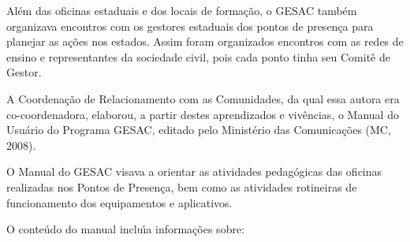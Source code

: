 \documentclass[
12pt,		%
openright,	%
twoside,  %
a4paper,			%
chapter=TITLE,		%
english,			%
french,				%
spanish,			%
brazil				%
]{USPSC-classe/USPSC}
\begin{document}
\noindent\begin{center}\mbox{\centering{}}\end{center}


Al\'em das oficinas estaduais e dos locais de forma\c{c}\~ao, o GESAC tamb\'em organizava encontros com os gestores estaduais dos pontos de presen\c{c}a para planejar as a\c{c}\~oes nos estados. Assim foram organizados encontros com as redes de ensino e  representantes da sociedade civil, pois cada ponto  tinha seu Comit\^e de Gestor.










A Coordena\c{c}\~ao de Relacionamento com as Comunidades, da qual essa autora era co-coordenadora, elaborou, a partir destes aprendizados e viv\^encias, o \textquotedbl Manual do Usu\'ario do Programa GESAC\textquotedbl , editado pelo Minist\'erio das Comunica\c{c}\~oes (MC, 2008).










O Manual do GESAC visava a orientar as atividades pedag\'ogicas das oficinas realizadas nos Pontos de Presen\c{c}a, bem como as  atividades rotineiras de funcionamento dos equipamentos e aplicativos.










O conte\'udo do manual inclu\'{\i}a informa\c{c}\~oes sobre:
\end{document}
